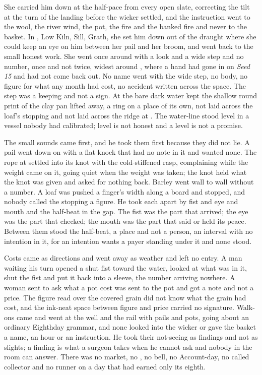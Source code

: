 She carried him down  at the half-pace from every open slate, correcting the tilt at the turn of the landing before the wicker settled, and the instruction went to the wool, the river wind, the pot, the fire and the banked fire and never to the basket. In , Low Kiln, Sill, Grath, she set him down out of the draught where she could keep an eye on him between her pail and her broom, and went back to the small honest work. She went once around  with a look and a wide step and no number, once and not twice, widest around , where a hand had gone in on \emph{Seed 15} and had not come back out. No name went with the wide step, no body, no figure for what any month had cost, no accident written across the space. The step was a keeping and not a sign. At  the bare dark water kept the shallow round print of the clay pan lifted away, a ring on a place of its own, not laid across the loaf's stopping and not laid across the ridge at . The water-line stood level in a vessel nobody had calibrated; level is not honest and a level is not a promise.

The small sounds came first, and he took them first because they did not lie. A pail went down on  with a flat knock that had no note in it and wanted none. The rope at  settled into its knot with the cold-stiffened rasp, complaining while the weight came on it, going quiet when the weight was taken; the knot held what the knot was given and asked for nothing back. Barley went wall to wall without a number. A loaf was pushed a finger's width along a board and stopped, and nobody called the stopping a figure. He took each apart by fist and eye and mouth and the half-beat in the gap. The fist was the part that arrived; the eye was the part that checked; the mouth was the part that said or held its peace. Between them stood the half-beat, a place and not a person, an interval with no intention in it, for an intention wants a payer standing under it and none stood.

Costs came as directions and went away as weather and left no entry. A man waiting his turn opened a shut fist toward the water, looked at what was in it, shut the fist and put it back into a sleeve, the number arriving nowhere. A woman sent to ask what a pot cost was sent to the pot and got a note and not a price. The figure read over the covered grain did not know what the grain had cost, and the ink-neat space between figure and price carried no signature. Walk-ons came and went at the well and the rail with pails and pots, going about an ordinary Eighthday grammar, and none looked into the wicker or gave the basket a name, an hour or an instruction. He took their not-seeing as findings and not as slights; a finding is what a surgeon takes when he cannot ask and nobody in the room can answer. There was no market, no , no bell, no Account-day, no called collector and no runner on a day that had earned only its eighth.

